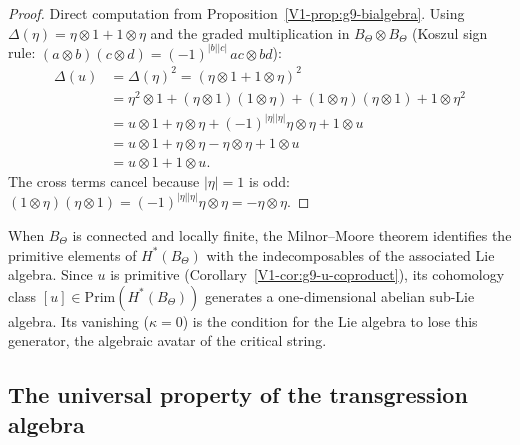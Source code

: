 \begin{proof}
Direct computation from Proposition~\ref{V1-prop:g9-bialgebra}.
Using $\Delta(\eta) = \eta \otimes 1 + 1 \otimes \eta$ and the
graded multiplication in $B_\Theta \otimes B_\Theta$
(Koszul sign rule: $(a \otimes b)(c \otimes d)
= (-1)^{|b||c|}\,ac \otimes bd$):
\begin{align*}
\Delta(u) &= \Delta(\eta)^2
= (\eta \otimes 1 + 1 \otimes \eta)^2 \\
&= \eta^2 \otimes 1
 + (\eta \otimes 1)(1 \otimes \eta)
 + (1 \otimes \eta)(\eta \otimes 1)
 + 1 \otimes \eta^2 \\
&= u \otimes 1
 + \eta \otimes \eta
 + (-1)^{|\eta||\eta|}\eta \otimes \eta
 + 1 \otimes u \\
&= u \otimes 1
 + \eta \otimes \eta
 - \eta \otimes \eta
 + 1 \otimes u \\
&= u \otimes 1 + 1 \otimes u.
\end{align*}
The cross terms cancel because $|\eta| = 1$ is odd:
$(1 \otimes \eta)(\eta \otimes 1) = (-1)^{|\eta||\eta|}\eta \otimes \eta
= -\eta \otimes \eta$.
\end{proof}

\begin{remark}
When $B_\Theta$ is connected and locally finite, the Milnor--Moore
theorem identifies the primitive elements of $H^*(B_\Theta)$ with the
indecomposables of the associated Lie algebra. Since $u$ is primitive
(Corollary~\ref{V1-cor:g9-u-coproduct}), its cohomology class
$[u] \in \mathrm{Prim}(H^*(B_\Theta))$ generates a one-dimensional
abelian sub-Lie algebra. Its vanishing ($\kappa = 0$) is the
condition for the Lie algebra to lose this generator, the algebraic
avatar of the critical string.
\end{remark}

%
%

\subsection{The universal property of the transgression algebra}

